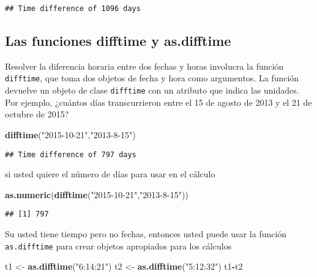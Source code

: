 \documentclass[]{article}
\newenvironment{Shaded}{\begin{snugshade}}{\end{snugshade}}
\newcommand{\KeywordTok}[1]{\textcolor[rgb]{0.13,0.29,0.53}{\textbf{#1}}}
\newcommand{\StringTok}[1]{\textcolor[rgb]{0.31,0.60,0.02}{#1}}
\newcommand{\OperatorTok}[1]{\textcolor[rgb]{0.81,0.36,0.00}{\textbf{#1}}}
\newcommand{\NormalTok}[1]{#1}
\begin{document}
\begin{verbatim}
## Time difference of 1096 days
\end{verbatim}

\subsection{Las funciones difftime y
as.difftime}\label{las-funciones-difftime-y-as.difftime}

Resolver la diferencia horaria entre dos fechas y horas involucra la
función \texttt{difftime}, que toma dos objetos de fecha y hora como
argumentos. La función devuelve un objeto de clase \texttt{difftime} con
un atributo que indica las unidades. Por ejemplo, ¿cuántos días
transcurrieron entre el 15 de agosto de 2013 y el 21 de octubre de 2015?

\begin{Shaded}
\begin{Highlighting}[]
\KeywordTok{difftime}\NormalTok{(}\StringTok{"2015-10-21"}\NormalTok{,}\StringTok{"2013-8-15"}\NormalTok{)}
\end{Highlighting}
\end{Shaded}

\begin{verbatim}
## Time difference of 797 days
\end{verbatim}

si usted quiere el número de días para usar en el cálculo

\begin{Shaded}
\begin{Highlighting}[]
\KeywordTok{as.numeric}\NormalTok{(}\KeywordTok{difftime}\NormalTok{(}\StringTok{"2015-10-21"}\NormalTok{,}\StringTok{"2013-8-15"}\NormalTok{))}
\end{Highlighting}
\end{Shaded}

\begin{verbatim}
## [1] 797
\end{verbatim}

Su usted tiene tiempo pero no fechas, entonces usted puede usar la
función \texttt{as.difftime} para crear objetos apropiados para los
cálculos

\begin{Shaded}
\begin{Highlighting}[]
\NormalTok{t1 <-}\StringTok{ }\KeywordTok{as.difftime}\NormalTok{(}\StringTok{"6:14:21"}\NormalTok{)}
\NormalTok{t2 <-}\StringTok{ }\KeywordTok{as.difftime}\NormalTok{(}\StringTok{"5:12:32"}\NormalTok{)}
\NormalTok{t1}\OperatorTok{-}\NormalTok{t2}
\end{Highlighting}
\end{Shaded}
\end{document}
